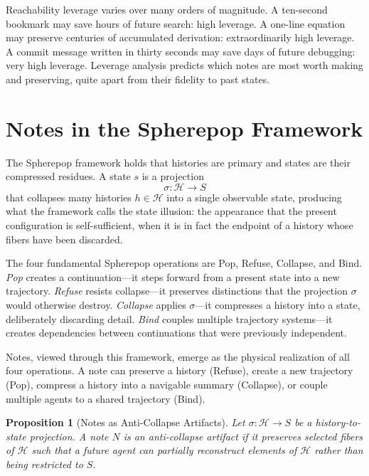 \documentclass[12pt, a4paper]{article}
\theoremstyle{plain}
\newtheorem{proposition}[theorem]{Proposition}
\theoremstyle{definition}
\theoremstyle{remark}
\begin{document}
Reachability leverage varies over many orders of magnitude. A ten-second bookmark
may save hours of future search: high leverage. A one-line equation may preserve
centuries of accumulated derivation: extraordinarily high leverage. A commit
message written in thirty seconds may save days of future debugging: very high
leverage. Leverage analysis predicts which notes are most worth making and
preserving, quite apart from their fidelity to past states.

\section{Notes in the Spherepop Framework}

The Spherepop framework holds that histories are primary and states are their
compressed residues. A state $s$ is a projection
\[
\sigma : \mathcal{H} \to S
\]
that collapses many histories $h \in \mathcal{H}$ into a single observable state,
producing what the framework calls the state illusion: the appearance that the
present configuration is self-sufficient, when it is in fact the endpoint of a
history whose fibers have been discarded.

The four fundamental Spherepop operations are Pop, Refuse, Collapse, and Bind.
\emph{Pop} creates a continuation---it steps forward from a present state into a
new trajectory. \emph{Refuse} resists collapse---it preserves distinctions that
the projection $\sigma$ would otherwise destroy. \emph{Collapse} applies
$\sigma$---it compresses a history into a state, deliberately discarding detail.
\emph{Bind} couples multiple trajectory systems---it creates dependencies between
continuations that were previously independent.

Notes, viewed through this framework, emerge as the physical realization of all
four operations. A note can preserve a history (Refuse), create a new trajectory
(Pop), compress a history into a navigable summary (Collapse), or couple multiple
agents to a shared trajectory (Bind).

\begin{proposition}[Notes as Anti-Collapse Artifacts]
Let $\sigma : \mathcal{H} \to S$ be a history-to-state projection. A note $N$
is an \emph{anti-collapse artifact} if it preserves selected fibers of $\mathcal{H}$
such that a future agent can partially reconstruct elements of $\mathcal{H}$ rather
than being restricted to $S$.
\end{proposition}
\end{document}
